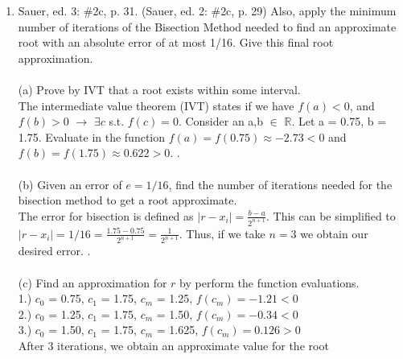 \documentclass[12pt]{article}
\begin{document}
\begin{enumerate}
	\item Sauer, ed. 3: $\#$2c, p. 31. (Sauer, ed. 2: $\#$2c, p. 29)  Also, apply the minimum number of iterations
of the Bisection Method needed to find an approximate root with an absolute error of at most
1/16. Give this final root approximation.\\ \\	
	(a) Prove by IVT that a root exists within some interval. \\ The intermediate value theorem (IVT) states if we have $f(a) < 0$, and $f(b) > 0$ $\rightarrow$ $\exists c$ s.t. $f(c) = 0$. Consider an a,b $\in$ $\mathbb{R}$. Let a = 0.75, b = 1.75. Evaluate in the function $f(a) = f(0.75) \approx -2.73 < 0$ and $f(b) = f(1.75) \approx 0.622 > 0$. . \\ \\
	 (b) Given an error of $e = 1/16$, find the number of iterations needed for the bisection method to get a root approximate. \\
	 The error for bisection is defined as $|r-x_i| = \frac{b-a}{2^{n+1}}$. This can be simplified to $|r-x_i| = 1/16 = \frac{1.75-0.75}{2^{n+1}} = \frac{1}{2^{n+1}}$. Thus, if we take $n=3$ we obtain our desired error. . \\ \\
	 (c) Find an approximation for $r$ by perform the function evaluations. \\
	 1.) $c_0$ = 0.75, $c_1$ = 1.75, $c_m$ = 1.25, $f(c_m) = -1.21 < 0$ \\
	 2.) $c_0$ = 1.25, $c_1$ = 1.75, $c_m$ = 1.50, $f(c_m) = -0.34 < 0$ \\
	 3.) $c_0$ = 1.50, $c_1$ = 1.75, $c_m$ = 1.625, $f(c_m) = 0.126 > 0$ \\
	 After 3 iterations, we obtain an approximate value for the root  \\ \\
	 

\end{enumerate}
\end{document}
